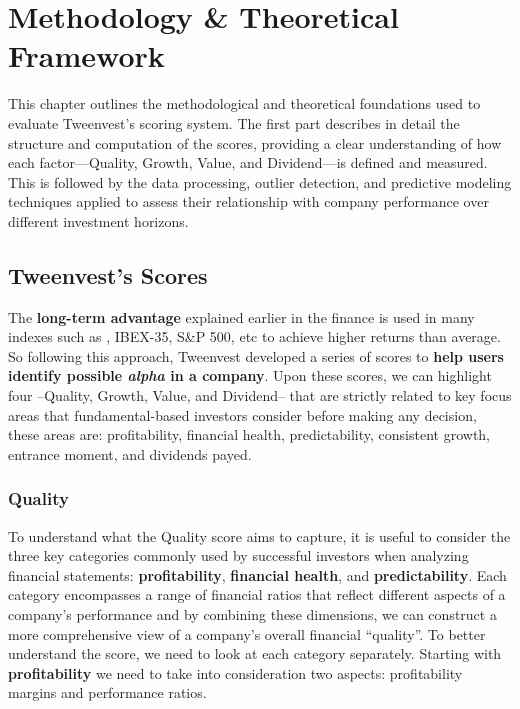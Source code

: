 \documentclass[11pt,english,a4paper,hidelinks]{book}
\begin{document}
\chapter{Methodology \& Theoretical Framework}

\noindent This chapter outlines the methodological and theoretical foundations used to evaluate Tweenvest’s scoring system. The first part describes in detail the structure and computation of the scores, providing a clear understanding of how each factor—Quality, Growth, Value, and Dividend—is defined and measured. This is followed by the data processing, outlier detection, and predictive modeling techniques applied to assess their relationship with company performance over different investment horizons.

\section{Tweenvest's Scores}

The \textbf{long-term advantage} explained earlier in the finance is used in many indexes such as \textcite{msci2024fundamental}, IBEX-35, S\&P 500, etc to achieve higher returns than average. So following this approach, Tweenvest developed a series of scores to \textbf{help users identify possible \textit{alpha} in a company}. Upon these scores, we can highlight four --Quality, Growth, Value, and Dividend-- that are strictly related to key focus areas that fundamental-based investors consider before making any decision, these areas are: profitability, financial health, predictability, consistent growth, entrance moment, and dividends payed.

\subsection{Quality}

\noindent To understand what the Quality score aims to capture, it is useful to consider the three key categories commonly used by successful investors when analyzing financial statements: \textbf{profitability}, \textbf{financial health}, and \textbf{predictability}. Each category encompasses a range of financial ratios that reflect different aspects of a company's performance and by combining these dimensions, we can construct a more comprehensive view of a company's overall financial ``quality''. To better understand the score, we need to look at each category separately. Starting with \textbf{profitability} we need to take into consideration two aspects: profitability margins and performance ratios.
\end{document}
